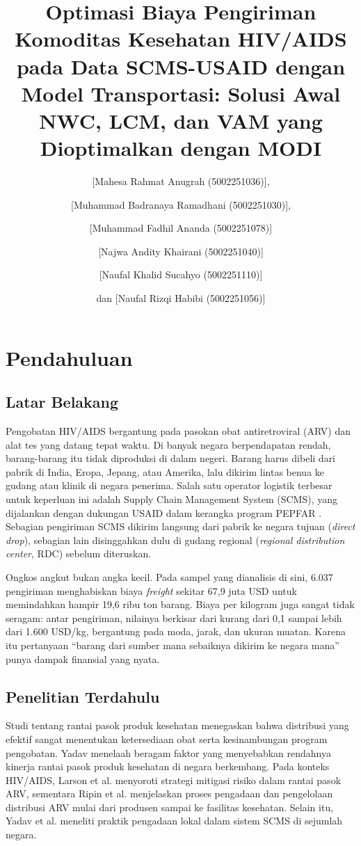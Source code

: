 \documentclass[a4paper,11pt]{article}
\title{\boldmath Optimasi Biaya Pengiriman Komoditas Kesehatan HIV/AIDS pada Data SCMS-USAID dengan Model Transportasi: Solusi Awal NWC, LCM, dan VAM yang Dioptimalkan dengan MODI}
\author[a,1]{[Mahesa Rahmat Anugrah (5002251036)],\note{Penulis korespondensi.}}
\author[a]{[Muhammad Badranaya Ramadhani (5002251030)],}
\author[a]{[Muhammad Fadhil Ananda (5002251078)]}
\author[a]{[Najwa Andity Khairani (5002251040)]}
\author[a]{[Naufal Khalid Sucahyo (5002251110)]}
\author[a]{dan [Naufal Rizqi Habibi (5002251056)]}
\affiliation[a]{[Departemen Matematika], Institut Teknologi Sepuluh Nopember,\\Surabaya, Jawa Timur, Indonesia 60111}
\begin{document}
\nocite{larson2014,yadav2018,yadav2015,ripin2014,jamieson2016,mokheseng2017,ghazvinian2025,fasci,harrath2018,karagul2020,amaliah2022a,amaliah2022b,mathirajan2004,ackoraprah2022,patne2019,usaid2006,harris2020}
\maketitle
\raggedbottom

\section{Pendahuluan}
\subsection{Latar Belakang}
Pengobatan HIV/AIDS bergantung pada pasokan obat antiretroviral (ARV) dan alat tes yang datang tepat waktu. Di banyak negara berpendapatan rendah, barang-barang itu tidak diproduksi di dalam negeri. Barang harus dibeli dari pabrik di India, Eropa, Jepang, atau Amerika, lalu dikirim lintas benua ke gudang atau klinik di negara penerima. Salah satu operator logistik terbesar untuk keperluan ini adalah Supply Chain Management System (SCMS), yang dijalankan dengan dukungan USAID dalam kerangka program PEPFAR \cite{larson2014,yadav2018}. Sebagian pengiriman SCMS dikirim langsung dari pabrik ke negara tujuan (\textit{direct drop}), sebagian lain disinggahkan dulu di gudang regional (\textit{regional distribution center}, RDC) sebelum diteruskan.

Ongkos angkut bukan angka kecil. Pada sampel yang dianalisis di sini, 6.037 pengiriman menghabiskan biaya \textit{freight} sekitar 67,9 juta USD untuk memindahkan hampir 19,6 ribu ton barang. Biaya per kilogram juga sangat tidak seragam: antar pengiriman, nilainya berkisar dari kurang dari 0,1 sampai lebih dari 1.600 USD/kg, bergantung pada moda, jarak, dan ukuran muatan. Karena itu pertanyaan ``barang dari sumber mana sebaiknya dikirim ke negara mana'' punya dampak finansial yang nyata.


\subsection{Penelitian Terdahulu}

Studi tentang rantai pasok produk kesehatan menegaskan bahwa distribusi yang efektif sangat menentukan ketersediaan obat serta kesinambungan program pengobatan. Yadav \cite{yadav2015} menelaah beragam faktor yang menyebabkan rendahnya kinerja rantai pasok produk kesehatan di negara berkembang. Pada konteks HIV/AIDS, Larson et al. \cite{larson2014} menyoroti strategi mitigasi risiko dalam rantai pasok ARV, sementara Ripin et al. \cite{ripin2014} menjelaskan proses pengadaan dan pengelolaan distribusi ARV mulai dari produsen sampai ke fasilitas kesehatan. Selain itu, Yadav et al. \cite{yadav2018} meneliti praktik pengadaan lokal dalam sistem SCMS di sejumlah negara.
\end{document}
